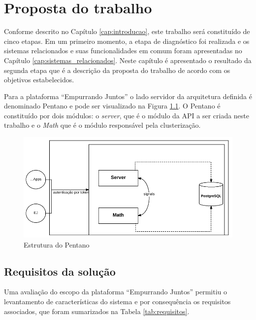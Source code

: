 \chapter{Proposta do trabalho} \label{cap:proposta}

Conforme descrito no Capítulo \ref{cap:introducao}, este trabalho será constituído de cinco etapas.
Em um primeiro momento, a etapa de diagnóstico foi realizada e os sistemas relacionados e suas funcionalidades em comum 
foram apresentadas no Capítulo \ref{cap:sistemas_relacionados}. Neste capítulo é apresentado o resultado da segunda etapa
que é a descrição da proposta do trabalho de acordo com os objetivos estabelecidos.

Para a plataforma ``Empurrando Juntos'' o lado servidor da arquitetura definida é denominado Pentano e pode ser visualizado na Figura \ref{fig:pentano}. 
O Pentano é constituído por dois módulos: o \textit{server}, 
que é o módulo da API a ser criada neste trabalho e o \textit{Math} que é o módulo responsável pela clusterização. 

\begin{figure}[h!]
\centering
\includegraphics[scale=0.8]{figuras/esquema_pentano.png}
\caption{Estrutura do Pentano}
\label{fig:pentano}
\end{figure}

\section{Requisitos da solução} \label{sec:requisitos}

Uma avaliação do escopo da plataforma ``Empurrando Juntos'' permitiu o levantamento de características do sistema e por consequência
os requisitos associados, que foram sumarizados na Tabela \ref{tab:requisitos}.

